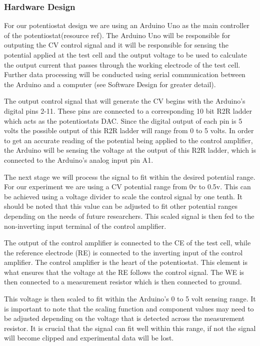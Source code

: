 \documentclass{article}
\begin{document}
\subsubsection*{Hardware Design}
For our potentiostat design we are using an Arduino Uno as the main controller of the potentiostat(resource ref). The Arduino Uno will be responsible for outputing the CV control signal and it will be responsible for sensing the potential applied at the test cell and the output voltage to be used to calculate the output current that passes through the working electrode of the test cell. Further data processing will be conducted using serial communication between the Arduino and a computer (see Software Design for greater detail).

The output control signal that will generate the CV begins with the Arduino's digital pins 2-11. These pins are connected to a corresponding 10 bit R2R ladder which acts as the potentiostats DAC. Since the digital output of each pin is 5 volts the possible output of this R2R ladder will range from 0 to 5 volts. In order to get an accurate reading of the potential being applied to the control amplifier, the Arduino will be sensing the voltage at the output of this R2R ladder, which is connected to the Arduino's analog input pin A1.

The next stage we will process the signal to fit within the desired potential range. For our experiment we are using a CV potential range from 0v to 0.5v. This can be achieved using a voltage divider to scale the control signal by one tenth. It should be noted that this value can be adjusted to fit other potential ranges depending on the needs of future researchers. This scaled signal is then fed to the non-inverting input terminal of the control amplifier. 

The output of the control amplifier is connected to the CE of the test cell, while the reference electrode (RE) is connected to the inverting input of the control amplifier. The control amplifier is the heart of the potentiostat. This element is what ensures that the voltage at the RE follows the control signal. The WE is then connected to a measurement resistor which is then connected to ground. 

This voltage is then scaled to fit within the Arduino's 0 to 5 volt sensing range. It is important to note that the scaling function and component values may need to be adjusted depending on the voltage that is detected across the measurement resistor. It is crucial that the signal can fit well within this range, if not the signal will become clipped and experimental data will be lost.
\end{document}
